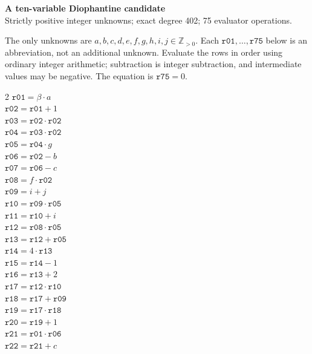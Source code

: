 \documentclass[10pt]{article}
\begin{document}
\begin{center}
{\large\bfseries A ten-variable Diophantine candidate}\\
{\small Strictly positive integer unknowns; exact degree 402; 75 evaluator operations.}
\end{center}
The only unknowns are \(a,b,c,d,e,f,g,h,i,j\in\mathbb Z_{>0}\).
Each \(\mathtt{r01},\ldots,\mathtt{r75}\) below is an abbreviation,
not an additional unknown. Evaluate the rows in order using ordinary integer
arithmetic; subtraction is integer subtraction, and intermediate values may be
negative. The equation is
\(\boxed{\mathtt{r75}=0}\).

\begin{multicols}{2}\small
\(\mathtt{r01} = \beta \cdot a\)\\
\(\mathtt{r02} = \mathtt{r01} + 1\)\\
\(\mathtt{r03} = \mathtt{r02} \cdot \mathtt{r02}\)\\
\(\mathtt{r04} = \mathtt{r03} \cdot \mathtt{r02}\)\\
\(\mathtt{r05} = \mathtt{r04} \cdot g\)\\
\(\mathtt{r06} = \mathtt{r02} - b\)\\
\(\mathtt{r07} = \mathtt{r06} - c\)\\
\(\mathtt{r08} = f \cdot \mathtt{r02}\)\\
\(\mathtt{r09} = i + j\)\\
\(\mathtt{r10} = \mathtt{r09} \cdot \mathtt{r05}\)\\
\(\mathtt{r11} = \mathtt{r10} + i\)\\
\(\mathtt{r12} = \mathtt{r08} \cdot \mathtt{r05}\)\\
\(\mathtt{r13} = \mathtt{r12} + \mathtt{r05}\)\\
\(\mathtt{r14} = 4 \cdot \mathtt{r13}\)\\
\(\mathtt{r15} = \mathtt{r14} - 1\)\\
\(\mathtt{r16} = \mathtt{r13} + 2\)\\
\(\mathtt{r17} = \mathtt{r12} \cdot \mathtt{r10}\)\\
\(\mathtt{r18} = \mathtt{r17} + \mathtt{r09}\)\\
\(\mathtt{r19} = \mathtt{r17} \cdot \mathtt{r18}\)\\
\(\mathtt{r20} = \mathtt{r19} + 1\)\\
\(\mathtt{r21} = \mathtt{r01} \cdot \mathtt{r06}\)\\
\(\mathtt{r22} = \mathtt{r21} + c\)\\

\end{multicols}
\end{document}
